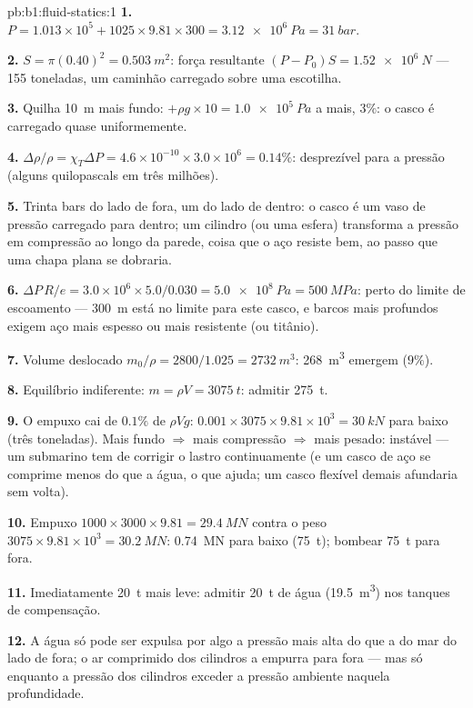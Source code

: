 \begin{solution}{pb:b1:fluid-statics:1}
\textbf{1.} $P = 1.013\times10^5 + 1025 \times 9.81 \times 300 = \qty{3.12e6}{Pa}
= \qty{31}{bar}$.

\textbf{2.} $S = \pi(0.40)^2 = \qty{0.503}{m^2}$: força resultante $(P - P_0)S =
\qty{1.52e6}{N}$ --- 155 toneladas, um caminhão carregado sobre uma escotilha.

\textbf{3.} Quilha \qty{10}{m} mais fundo: $+\rho g \times 10 = \qty{1.0e5}{Pa}$ a mais,
$3\%$: o casco é carregado quase uniformemente.

\textbf{4.} $\Delta\rho/\rho = \chi_T\Delta P = 4.6\times10^{-10} \times 3.0\times10^6
= 0.14\%$: desprezível para a pressão (alguns quilopascals em três
milhões).

\textbf{5.} Trinta bars do lado de fora, um do lado de dentro: o casco é um
vaso de pressão carregado para dentro; um cilindro (ou uma esfera) transforma
a pressão em compressão ao longo da parede, coisa que o aço resiste bem,
ao passo que uma chapa plana se dobraria.

\textbf{6.} $\Delta P\,R/e = 3.0\times10^6 \times 5.0/0.030 = \qty{5.0e8}{Pa}
= \qty{500}{MPa}$: perto do limite de escoamento --- \qty{300}{m} está no
limite para este casco, e barcos mais profundos exigem aço mais espesso ou
mais resistente (ou titânio).

\textbf{7.} Volume deslocado $m_0/\rho = 2800/1.025 = \qty{2732}{m^3}$: \qty{268}{m^3}
emergem ($9\%$).

\textbf{8.} Equilíbrio indiferente: $m = \rho V = \qty{3075}{t}$: admitir \qty{275}{t}.

\textbf{9.} O empuxo cai de $0.1\%$ de $\rho Vg$: $0.001 \times 3075 \times 9.81
\times10^3 = \qty{30}{kN}$ para baixo (três toneladas). Mais fundo $\Rightarrow$ mais
compressão $\Rightarrow$ mais pesado: instável --- um submarino tem de
corrigir o lastro continuamente (e um casco de aço se comprime menos do que
a água, o que ajuda; um casco flexível demais afundaria sem volta).

\textbf{10.} Empuxo $1000 \times 3000 \times 9.81 = \qty{29.4}{MN}$ contra o
peso $3075 \times 9.81 \times 10^3 = \qty{30.2}{MN}$: \qty{0.74}{MN} para baixo
(\qty{75}{t}); bombear \qty{75}{t} para fora.

\textbf{11.} Imediatamente \qty{20}{t} mais leve: admitir \qty{20}{t} de água
(\qty{19.5}{m^3}) nos tanques de compensação.

\textbf{12.} A água só pode ser expulsa por algo a pressão mais alta do que
a do mar do lado de fora; o ar comprimido dos cilindros a empurra para fora
--- mas só enquanto a pressão dos cilindros exceder a pressão ambiente
naquela profundidade.


\end{solution}
